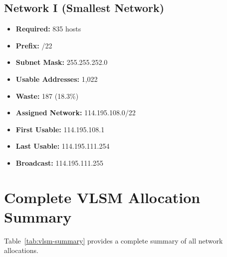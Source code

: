 \documentclass[12pt,a4paper]{report}
\begin{document}
\subsection{Network I (Smallest Network)}

\begin{itemize}
    \item \textbf{Required:} 835 hosts
    \item \textbf{Prefix:} /22
    \item \textbf{Subnet Mask:} 255.255.252.0
    \item \textbf{Usable Addresses:} 1,022
    \item \textbf{Waste:} 187 (18.3\%)
    \item \textbf{Assigned Network:} 114.195.108.0/22
    \item \textbf{First Usable:} 114.195.108.1
    \item \textbf{Last Usable:} 114.195.111.254
    \item \textbf{Broadcast:} 114.195.111.255
\end{itemize}

\section{Complete VLSM Allocation Summary}

Table~\ref{tab:vlsm-summary} provides a complete summary of all network allocations.
\end{document}

